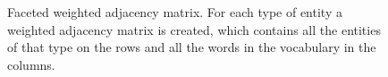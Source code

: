 \begin{figure}
\centering 
\resizebox{0.97\textwidth}{0.26\textwidth}{      

}
 \caption{Faceted weighted adjacency matrix. For each type of entity a weighted adjacency matrix is created, which contains all the entities of that type on the rows and all the words in the vocabulary in the columns.}
 \label{fig:co-matrix}
\end{figure}
